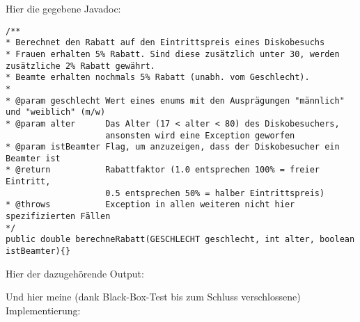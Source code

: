 \documentclass{article}
\begin{document}
    \newpage

    Hier die gegebene Javadoc:

    \begin{verbatim}
/**
* Berechnet den Rabatt auf den Eintrittspreis eines Diskobesuchs
* Frauen erhalten 5% Rabatt. Sind diese zusätzlich unter 30, werden zusätzliche 2% Rabatt gewährt.
* Beamte erhalten nochmals 5% Rabatt (unabh. vom Geschlecht).
*
* @param geschlecht Wert eines enums mit den Ausprägungen "männlich" und "weiblich" (m/w)
* @param alter      Das Alter (17 < alter < 80) des Diskobesuchers,
                    ansonsten wird eine Exception geworfen
* @param istBeamter Flag, um anzuzeigen, dass der Diskobesucher ein Beamter ist
* @return           Rabattfaktor (1.0 entsprechen 100% = freier Eintritt,
                    0.5 entsprechen 50% = halber Eintrittspreis)
* @throws           Exception in allen weiteren nicht hier spezifizierten Fällen
*/
public double berechneRabatt(GESCHLECHT geschlecht, int alter, boolean istBeamter){}
    \end{verbatim}

    Hier der dazugehörende Output:


    \newpage

    Und hier meine (dank Black-Box-Test bis zum Schluss verschlossene) Implementierung:
    
    \inputminted{java}{Diskobesuch.java}
\end{document}
